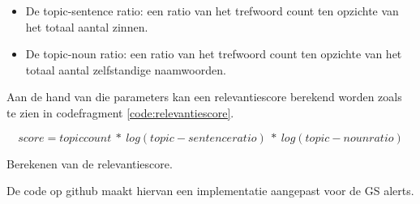 \begin{itemize}
    \item De topic-sentence ratio: een ratio van het trefwoord count ten opzichte van het totaal aantal zinnen.
    \item De topic-noun ratio: een ratio van het trefwoord count ten opzichte van het totaal aantal zelfstandige naamwoorden.
\end{itemize}
Aan de hand van die parameters kan een relevantiescore berekend worden zoals te zien in codefragment \ref{code:relevantiescore}.
\begin{listing}[h!]
    \[
        score=topic count\ \ast\ log\left(topic-sentence ratio\right)\ \ast\ log\left(topic-noun ratio\right)
    \]  
    \caption[relevantiescore]{Berekenen van de relevantiescore.}
    \label{code:relevantiescore}
\end{listing}
De code op github \textcite{Depaepenlp2025} maakt hiervan een implementatie aangepast voor de GS alerts.
